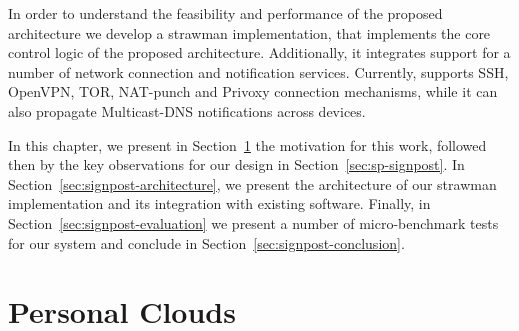 
In order to understand the feasibility and performance of the proposed
architecture we develop a strawman implementation, that implements the core
control logic of the proposed architecture.  Additionally, it integrates support
for a number of network connection and notification services.  Currently,
\signpost supports SSH, OpenVPN, TOR, NAT-punch and Privoxy connection
mechanisms, while it can also propagate Multicast-DNS notifications across devices.

In this chapter, we present in Section~\ref{sec:signpost-introduction} the
motivation for this work, followed then by the key observations for our design
in Section~\ref{sec:sp-signpost}. In
Section~\ref{sec:signpost-architecture}, we present the architecture of our
strawman implementation and its integration with existing software. Finally, in
Section~\ref{sec:signpost-evaluation} we present a number of micro-benchmark
tests for our system and conclude in Section~\ref{sec:signpost-conclusion}.

\section{Personal Clouds}\label{sec:signpost-introduction}


